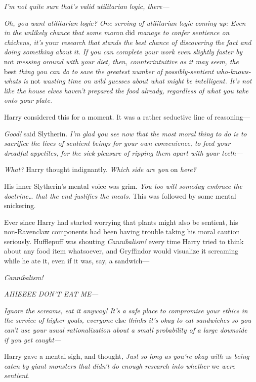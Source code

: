 \emph{I'm not quite sure that's valid utilitarian logic, there---}

\emph{Oh, you want utilitarian logic? One serving of utilitarian logic coming 
up: Even in the unlikely chance that some moron} did\emph{ manage to confer 
sentience on chickens, it's} your\emph{ research that stands the best chance of 
discovering the fact and doing something about it. If you can complete your 
work even slightly faster by} not\emph{ messing around with your diet, then, 
counterintuitive as it may seem, the} best\emph{ thing you can do to save the 
greatest number of possibly-sentient who-knows-whats is} not\emph{ wasting time 
on wild guesses about what might be intelligent. It's not like the house elves 
haven't prepared the food already, regardless of what you take onto your plate.}

Harry considered this for a moment. It was a rather seductive line of 
reasoning---

\emph{Good!} said Slytherin. \emph{I'm glad you see now that the most moral 
thing to do is to sacrifice the lives of sentient beings for your own 
convenience, to feed your dreadful appetites, for the sick pleasure of ripping 
them apart with your teeth---}

\emph{What?} Harry thought indignantly. \emph{Which side are you} on\emph{ 
here?}

His inner Slytherin's mental voice was grim. \emph{You too will someday embrace 
the doctrine{\ldots} that the end justifies the meats.} This was followed by 
some mental snickering.

Ever since Harry had started worrying that plants might also be sentient, his 
non-Ravenclaw components had been having trouble taking his moral caution 
seriously. Hufflepuff was shouting \emph{Cannibalism!} every time Harry tried 
to think about any food item whatsoever, and Gryffindor would visualize it 
screaming while he ate it, even if it was, say, a sandwich---

\emph{Cannibalism!}

\emph{AIIIEEEE DON'T EAT ME---}

\emph{Ignore the screams, eat it anyway! It's a safe place to compromise your 
ethics in the service of higher goals, everyone} else\emph{ thinks it's okay to 
eat sandwiches so you can't use your usual rationalization about a small 
probability of a large downside if you get caught---}

Harry gave a mental sigh, and thought, \emph{Just so long as you're okay with} 
us\emph{ being eaten by giant monsters that didn't do enough research into 
whether} we\emph{ were sentient.}

